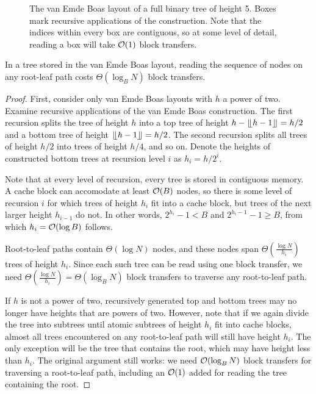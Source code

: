 \begin{figure}

\caption{The van Emde Boas layout of a full binary tree of height 5.
Boxes mark recursive applications of the construction. Note that the indices
within every box are contiguous, so at some level of detail, reading
a box will take $\mathcal{O}(1)$ block transfers.}
\label{fig:veb_layout_5}
\end{figure}

\begin{theorem}
In a tree stored in the van Emde Boas layout, reading the sequence of nodes
on any root-leaf path costs $\Theta(\log_B N)$ block transfers.
\end{theorem}

\begin{proof}
First, consider only van Emde Boas layouts with $h$ a power of two.
Examine recursive applications of the van Emde Boas construction.
The first recursion splits the tree of height $h$ into a top tree of height
$h-\lfloor \kern -0.22em \lfloor h-1\rfloor \kern -0.22em \rfloor=h/2$ and a bottom tree of height $\lfloor \kern -0.22em \lfloor
h-1\rfloor \kern -0.22em \rfloor=h/2$. The second recursion splits all trees of height $h/2$
into trees of height $h/4$, and so on. Denote the heights of constructed bottom
trees at recursion level $i$ as $h_i=h/2^i$.

Note that at every level of recursion, every tree is stored in contiguous
memory. A cache block can accomodate at least $\mathcal{O}(B)$ nodes, so there is some
level of recursion $i$ for which trees of height $h_i$ fit into a cache block,
but trees of the next larger height $h_{i-1}$ do not. In other words,
$2^{h_i}-1 < B$ and $2^{h_i-1}-1 \geq B$, from which $h_i=\mathcal{O}(\log B)$ follows.

Root-to-leaf paths contain $\Theta(\log N)$ nodes, and these nodes span
$\Theta(\frac{\log N}{h_i})$ trees of height $h_i$. Since each such tree can be
read using one block transfer, we need $\Theta(\frac{\log N}{h_i})=\Theta(\log_B
N)$ block transfers to traverse any root-to-leaf path.

If $h$ is not a power of two, recursively generated top and bottom trees may no
longer have heights that are powers of two. However, note that if we again
divide the tree into subtrees until atomic subtrees of height $h_i$ fit into
cache blocks, almost all trees encountered on any root-to-leaf path will still
have height $h_i$. The only exception will be the tree that contains the root,
which may have height less than $h_i$. The original argument still works:
we need $\mathcal{O}(\log_B N)$ block transfers for traversing a root-to-leaf path,
including an $\mathcal{O}(1)$ added for reading the tree containing the root.
\end{proof}

